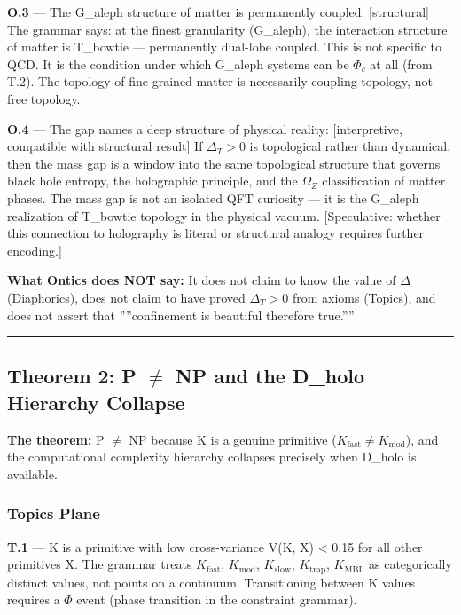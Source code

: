 \documentclass[11pt,a4paper]{article}
\begin{document}
\textbf{O.3} --- The G\_aleph structure of matter is permanently coupled: {[}structural{]} The grammar says: at the finest granularity (G\_aleph), the interaction structure of matter is T\_bowtie --- permanently dual-lobe coupled. This is not specific to QCD. It is the condition under which G\_aleph systems can be $\Phi_c$ at all (from T.2). The topology of fine-grained matter is necessarily coupling topology, not free topology.

\textbf{O.4} --- The gap names a deep structure of physical reality: {[}interpretive, compatible with structural result{]} If $\Delta_T > 0$ is topological rather than dynamical, then the mass gap is a window into the same topological structure that governs black hole entropy, the holographic principle, and the $\Omega_Z$ classification of matter phases. The mass gap is not an isolated QFT curiosity --- it is the G\_aleph realization of T\_bowtie topology in the physical vacuum. {[}Speculative: whether this connection to holography is literal or structural analogy requires further encoding.{]}

\textbf{What Ontics does NOT say:} It does not claim to know the value of $\Delta$ (Diaphorics), does not claim to have proved $\Delta_T > 0$ from axioms (Topics), and does not assert that ''''confinement is beautiful therefore true.''''

\begin{center}
\rule{0.5\textwidth}{0.4pt}
\end{center}

\subsection{Theorem 2: P $\neq$ NP and the D\_holo Hierarchy Collapse}

\textbf{The theorem:} P $\neq$ NP because K is a genuine primitive ($K_\text{fast} \neq K_\text{mod}$), and the computational complexity hierarchy collapses precisely when D\_holo is available.

\subsubsection{Topics Plane}

\textbf{T.1} --- K is a primitive with low cross-variance V(K, X) \textless{} 0.15 for all other primitives X. The grammar treats $K_\text{fast}$, $K_\text{mod}$, $K_\text{slow}$, $K_\text{trap}$, $K_\text{MBL}$ as categorically distinct values, not points on a continuum. Transitioning between K values requires a $\Phi$ event (phase transition in the constraint grammar).
\end{document}
